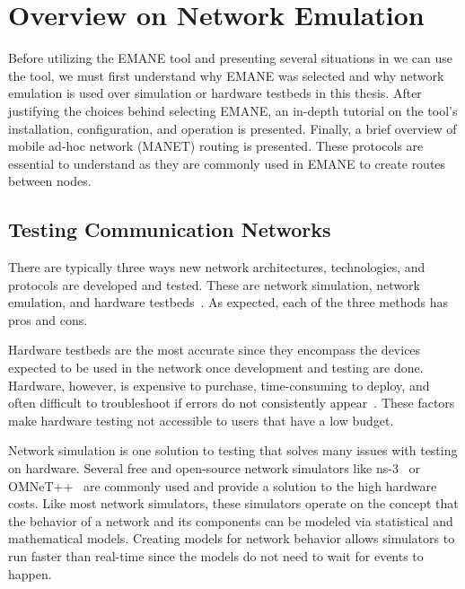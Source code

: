 \chapter{Overview on Network Emulation}
\label{chapter2}
Before utilizing the EMANE tool and presenting several situations in we can use the tool, we must first understand why EMANE was selected and why network emulation is used over simulation or hardware testbeds in this thesis.
After justifying the choices behind selecting EMANE, an in-depth tutorial on the tool's installation, configuration, and operation is presented.
Finally, a brief overview of mobile ad-hoc network (MANET) routing is presented.
These protocols are essential to understand as they are commonly used in EMANE to create routes between nodes.\par

\section{Testing Communication Networks} %
There are typically three ways new network architectures, technologies, and protocols are developed and tested. These are network simulation, network emulation, and hardware testbeds~\cite{simulation_emulation}.
As expected, each of the three methods has pros and cons.\par
Hardware testbeds are the most accurate since they encompass the devices expected to be used in the network once development and testing are done.
Hardware, however, is expensive to purchase, time-consuming to deploy, and often difficult to troubleshoot if errors do not consistently appear~\cite{nsclick}.
These factors make hardware testing not accessible to users that have a low budget.\par
Network simulation is one solution to testing that solves many issues with testing on hardware.
Several free and open-source network simulators like ns-3~\cite{ns3} or OMNeT++~\cite{omnet++} are commonly used and provide a solution to the high hardware costs.
Like most network simulators, these simulators operate on the concept that the behavior of a network and its components can be modeled via statistical and mathematical models.
Creating models for network behavior allows simulators to run faster than real-time since the models do not need to wait for events to happen.
